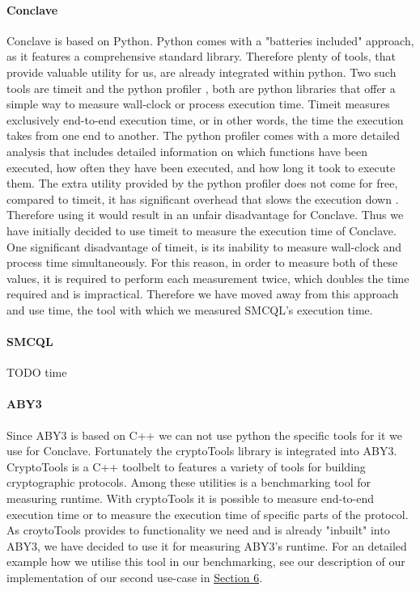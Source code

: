 \paragraph{Conclave}
Conclave is based on Python. Python comes with a "batteries included" approach, as it features a comprehensive standard library. Therefore plenty of tools, that provide valuable utility for us, are already integrated within python. Two such tools are timeit \cite{time} and the python profiler \cite{cProfile}, both are python libraries that offer a simple way to measure wall-clock or process execution time. Timeit measures exclusively end-to-end execution time, or in other words, the time the execution takes from one end to another. The python profiler comes with a more detailed analysis that includes detailed information on which functions have been executed, how often they have been executed, and how long it took to execute them. The extra utility provided by the python profiler does not come for free, compared to timeit, it has significant overhead that slows the execution down \cite{cProfile}. Therefore using it would result in an unfair disadvantage for Conclave. Thus we have initially decided to use timeit to measure the execution time of Conclave. One significant disadvantage of timeit, is its inability to measure wall-clock and process time simultaneously. For this reason, in order to measure both of these values, it is required to perform each measurement twice, which doubles the time required and is impractical. Therefore we have moved away from this approach and use time, the tool with which we measured SMCQL's execution time.  
\paragraph{SMCQL}

TODO time \cite{time_sh}
\paragraph{ABY3}
Since ABY3 is based on C++ we can not use python the specific tools for it we use for Conclave. Fortunately the cryptoTools library \cite{cryotoTools} is integrated into ABY3. CryptoTools is a C++ toolbelt to features a variety of tools for building cryptographic protocols. Among these utilities is a benchmarking tool for measuring runtime. With cryptoTools it is possible to measure end-to-end execution time or to measure the execution time of specific parts of the protocol. As croytoTools provides to functionality we need and is already "inbuilt" into ABY3, we have decided to use it for measuring ABY3's runtime. For an detailed example how we utilise this tool in our benchmarking, see our description of our implementation of our second use-case in \hyperref[Implemetation]{Section 6}.




